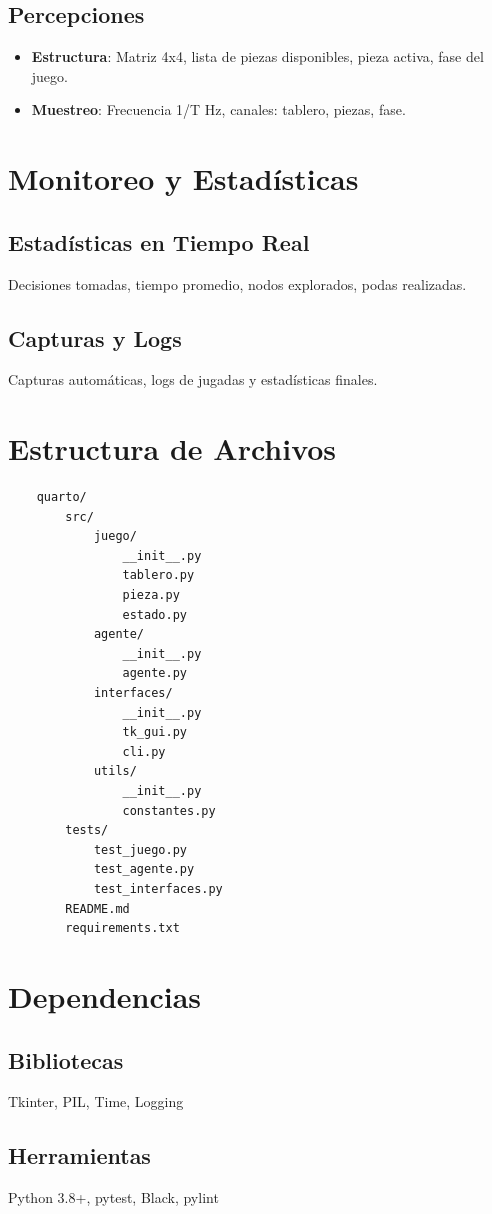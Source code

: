 \documentclass[conference]{IEEEtran}
\begin{document}
\subsection{Percepciones}
\begin{itemize}
	\item \textbf{Estructura}: Matriz 4x4, lista de piezas disponibles, pieza activa, fase del juego.
	\item \textbf{Muestreo}: Frecuencia 1/T Hz, canales: tablero, piezas, fase.
\end{itemize}

\section{Monitoreo y Estadísticas}

\subsection{Estadísticas en Tiempo Real}
Decisiones tomadas, tiempo promedio, nodos explorados, podas realizadas.

\subsection{Capturas y Logs}
Capturas automáticas, logs de jugadas y estadísticas finales.

\section{Estructura de Archivos}
\begin{verbatim}
	quarto/
	    src/
	        juego/
				__init__.py
				tablero.py
				pieza.py
				estado.py
			agente/
				__init__.py
				agente.py
			interfaces/
				__init__.py
				tk_gui.py
				cli.py
			utils/
				__init__.py
				constantes.py
		tests/
			test_juego.py
			test_agente.py
			test_interfaces.py
		README.md
		requirements.txt
\end{verbatim}

\section{Dependencias}
\subsection{Bibliotecas}
Tkinter, PIL, Time, Logging

\subsection{Herramientas}
Python 3.8+, pytest, Black, pylint
\end{document}
